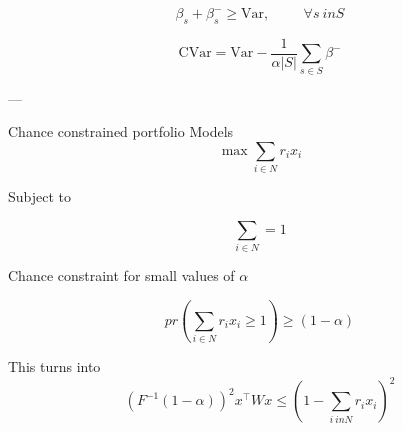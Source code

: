 \[ \beta_s + \beta_s^{-} \ge \text{Var}, \hspace{1cm} \forall s \ in S \]

\[ \text{CVar} = \text{Var} - \frac{1}{\alpha |S|} \sum_{s \in S} \beta^{-} \]

---

Chance constrained portfolio Models
\[ \max \sum_{i \in N} r_i x_i \]

Subject to

\[ \sum_{i \in N} = 1 \]

Chance constraint for small values of $\alpha$

\[ pr\left(\sum_{i \in N} r_i x_i \ge 1\right) \ge (1 - \alpha) \]

This turns into 
\[ (F^{-1} (1 - \alpha))^2 x^\top W x \le \left(1 - \sum_{i \ in N} r_i x_i \right)^2 \]

